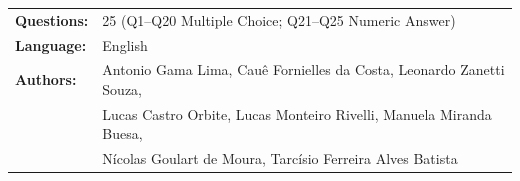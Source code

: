 \documentclass[12pt, a4paper]{article}
\begin{document}

{\small\sffamily
\begin{tabular}{ll}
  \textbf{Questions:} & 25 (Q1--Q20 Multiple Choice; Q21--Q25 Numeric Answer) \\
  \textbf{Language:}  & English \\
  \textbf{Authors:}   & Antonio Gama Lima, Cauê Fornielles da Costa,
                        Leonardo Zanetti Souza, \\
                      & Lucas Castro Orbite, Lucas Monteiro Rivelli,
                        Manuela Miranda Buesa, \\
                      & Nícolas Goulart de Moura, Tarcísio Ferreira Alves Batista \\
\end{tabular}
}

\vspace{12pt}




\end{document}
